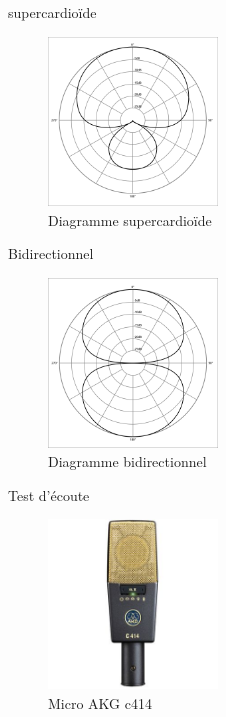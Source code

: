 \documentclass[aspectratio=169]{beamer}
\begin{document}
\begin{frame}{supercardioïde}
	\begin{figure}[!h]
	\begin{center}
	\includegraphics[width=0.4\textwidth]{figure/Polar_pattern_supercardioid.png}
	\end{center}
	\caption{Diagramme supercardioïde}
	\end{figure}
\end{frame}
\begin{frame}{Bidirectionnel}
	\begin{figure}[!h]
	\begin{center}
	\includegraphics[width=0.4\textwidth]{figure/Polar_pattern_figure_eight.png}
	\end{center}
	\caption{Diagramme bidirectionnel}
	\end{figure}
\end{frame}
\begin{frame}{Test d'écoute}

	\begin{figure}[!h]
	\begin{center}
	\includegraphics[width=0.4\textwidth]{figure/akg-c414-xlii-120450.jpg}
	\end{center}
	\caption{Micro AKG c414}
	\end{figure}
\end{frame}
\end{document}
